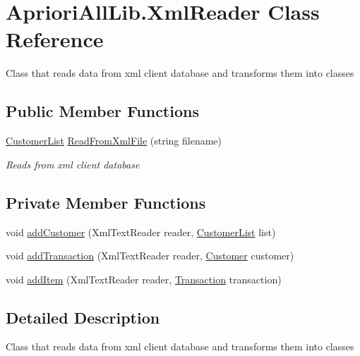 \hypertarget{class_apriori_all_lib_1_1_xml_reader}{\section{Apriori\-All\-Lib.\-Xml\-Reader Class Reference}
\label{class_apriori_all_lib_1_1_xml_reader}
}


Class that reads data from xml client database and transforms them into classes  


\subsection*{Public Member Functions}
\begin{DoxyCompactItemize}
\item 
\hyperlink{class_apriori_all_lib_1_1_customer_list}{Customer\-List} \hyperlink{class_apriori_all_lib_1_1_xml_reader_ab7285c4d5cee31f7a1001f00f4eeff25}{Read\-From\-Xml\-File} (string filename)
\begin{DoxyCompactList}\small\item\em Reads from xml client database \end{DoxyCompactList}\end{DoxyCompactItemize}
\subsection*{Private Member Functions}
\begin{DoxyCompactItemize}
\item 
void \hyperlink{class_apriori_all_lib_1_1_xml_reader_a117782b010f24408af2a1308786b473a}{add\-Customer} (Xml\-Text\-Reader reader, \hyperlink{class_apriori_all_lib_1_1_customer_list}{Customer\-List} list)
\item 
void \hyperlink{class_apriori_all_lib_1_1_xml_reader_ad39b320cc29d31704fbaa7b121cbc3ba}{add\-Transaction} (Xml\-Text\-Reader reader, \hyperlink{class_apriori_all_lib_1_1_customer}{Customer} customer)
\item 
void \hyperlink{class_apriori_all_lib_1_1_xml_reader_a24244fe32b889d4f7a4f44a9aeb11779}{add\-Item} (Xml\-Text\-Reader reader, \hyperlink{class_apriori_all_lib_1_1_transaction}{Transaction} transaction)
\end{DoxyCompactItemize}


\subsection{Detailed Description}
Class that reads data from xml client database and transforms them into classes 



